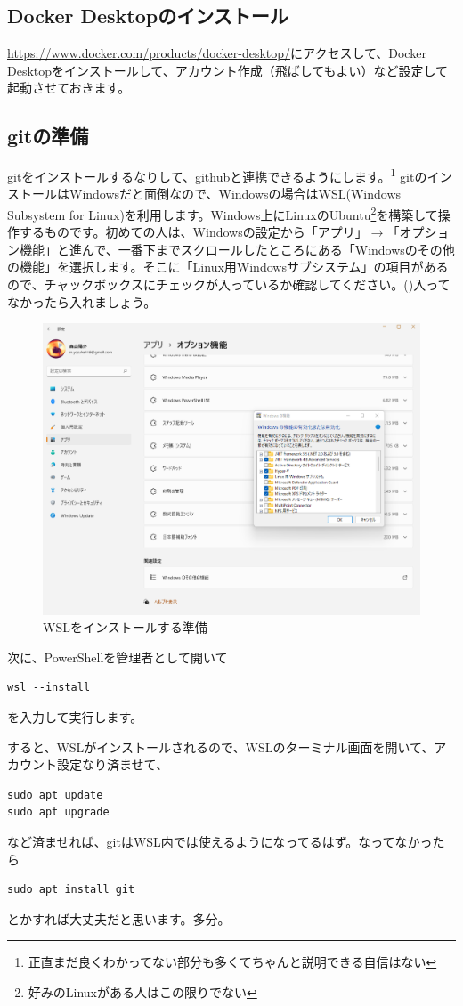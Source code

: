 \documentclass[../super_nova_20yy]{subfiles}
\begin{document}
\subsection{Docker Desktopのインストール}
\url{https://www.docker.com/products/docker-desktop/}にアクセスして、Docker Desktopをインストールして、アカウント作成（飛ばしてもよい）など設定して起動させておきます。
\subsection{gitの準備}
gitをインストールするなりして、githubと連携できるようにします。\footnote{正直まだ良くわかってない部分も多くてちゃんと説明できる自信はない}
gitのインストールはWindowsだと面倒なので、Windowsの場合はWSL(Windows Subsystem for Linux)を利用します。Windows上にLinuxのUbuntu\footnote{好みのLinuxがある人はこの限りでない}を構築して操作するものです。初めての人は、Windowsの設定から「アプリ」$\rightarrow$「オプション機能」と進んで、一番下までスクロールしたところにある「Windowsのその他の機能」を選択します。そこに「Linux用Windowsサブシステム」の項目があるので、チャックボックスにチェックが入っているか確認してください。()入ってなかったら入れましょう。
\begin{figure}[H]
  \centering
  \includegraphics[width=.5\textwidth]{figures/ss274.png}
  \caption{WSLをインストールする準備}
  \label{fig:wsl}
\end{figure}
次に、PowerShellを管理者として開いて
\begin{lstlisting}
wsl --install
\end{lstlisting}
を入力して実行します。

すると、WSLがインストールされるので、WSLのターミナル画面を開いて、アカウント設定なり済ませて、
\begin{lstlisting}
sudo apt update
sudo apt upgrade
\end{lstlisting}
など済ませれば、gitはWSL内では使えるようになってるはず。なってなかったら
\begin{lstlisting}
sudo apt install git
\end{lstlisting}
とかすれば大丈夫だと思います。多分。
\end{document}
